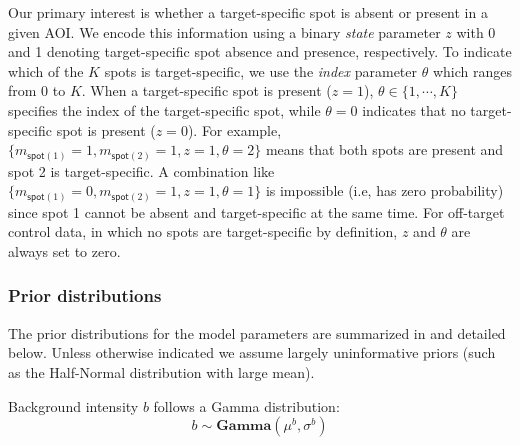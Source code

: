 Our primary interest is whether a target-specific spot is absent or present in a given AOI. We encode this information using a binary \emph{state} parameter $z$ with 0 and 1 denoting target-specific spot absence and presence, respectively. To indicate which of the $K$ spots is target-specific, we use the \emph{index} parameter $\theta$ which ranges from $0$ to $K$. When a target-specific spot is present ($z = 1$), $\theta \in \{1, \cdots, K \}$ specifies the index of the target-specific spot, while $\theta = 0$ indicates that no target-specific spot is present ($z = 0$). For example, $\{ m_{\mathsf{spot}(1)}=1, m_{\mathsf{spot}(2)}=1, z = 1, \theta=2 \}$ means that both spots are present and spot 2 is target-specific. A combination like $\{ m_{\mathsf{spot}(1)}=0, m_{\mathsf{spot}(2)}=1, z = 1, \theta=1 \}$ is impossible (i.e, has zero probability) since spot 1 cannot be absent and target-specific at the same time. For off-target control data, in which no spots are target-specific by definition, $z$ and $\theta$ are always set to zero.
%

\subsubsection{Prior distributions}

The prior distributions for the model parameters are summarized in  and detailed below. Unless otherwise indicated we assume largely uninformative priors (such as the Half-Normal distribution with large mean). 

Background intensity $b$ follows a Gamma distribution:
%
\begin{equation}
    b \sim \mathbf{Gamma}(\mu^b, \sigma^b)
\end{equation}

